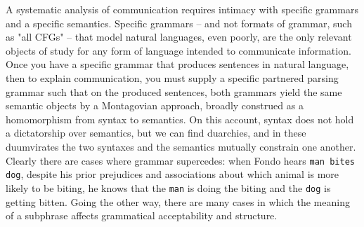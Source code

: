 A systematic analysis of communication requires intimacy with specific grammars and a specific semantics. Specific grammars -- and not formats of grammar, such as "all CFGs" -- that model natural languages, even poorly, are the only relevant objects of study for any form of language intended to communicate information. Once you have a specific grammar that produces sentences in natural language, then to explain communication, you must supply a specific partnered parsing grammar such that on the produced sentences, both grammars yield the same semantic objects by a Montagovian approach, broadly construed as a homomorphism from syntax to semantics. On this account, syntax does not hold a dictatorship over semantics, but we can find duarchies, and in these duumvirates the two syntaxes and the semantics mutually constrain one another.\\

 Clearly there are cases where grammar supercedes: when Fondo hears \texttt{man bites dog}, despite his prior prejudices and associations about which animal is more likely to be biting, he knows that the \texttt{man} is doing the biting and the \texttt{dog} is getting bitten. Going the other way, there are many cases in which the meaning of a subphrase affects grammatical acceptability and structure.

